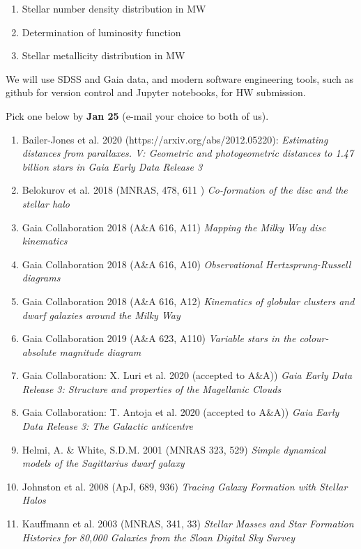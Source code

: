 \documentclass[10pt]{article}
\begin{document}
\begin{enumerate}
\item Stellar number density distribution in MW
\item Determination of luminosity function 
\item Stellar metallicity distribution in MW  
\end{enumerate}

We will use SDSS and Gaia data, and modern software engineering tools, such as github for version control and Jupyter 
notebooks, for HW submission. 

\vskip 0.2in

 Pick one below by {\bf Jan 25} (e-mail your choice to both of us).

\begin{enumerate}
\item Bailer-Jones et al. 2020 (https://arxiv.org/abs/2012.05220):
 {\it Estimating distances from parallaxes. V: Geometric and photogeometric distances to 
1.47 billion stars in Gaia Early Data Release 3} 
\item Belokurov et al. 2018 (MNRAS, 478, 611 ) 
 {\it Co-formation of the disc and the stellar halo}  
\item Gaia Collaboration 2018 (A\&A 616, A11)
{\it Mapping the Milky Way disc kinematics}
\item Gaia Collaboration 2018 (A\&A 616, A10)
{\it Observational Hertzsprung-Russell diagrams}
\item Gaia Collaboration 2018 (A\&A 616, A12)
{\it Kinematics of globular clusters and dwarf galaxies around the Milky Way}
 \item Gaia Collaboration 2019 (A\&A 623, A110)
{\it Variable stars in the colour-absolute magnitude diagram}
\item  Gaia Collaboration: X. Luri et al. 2020 (accepted to A\&A))
{\it Gaia Early Data Release 3: Structure and properties of the Magellanic Clouds}
\item  Gaia Collaboration: T. Antoja et al. 2020 (accepted to A\&A))
{\it Gaia Early Data Release 3: The Galactic anticentre}
\item Helmi, A. \& White, S.D.M. 2001 (MNRAS 323, 529)
         {\it Simple dynamical models of the Sagittarius dwarf galaxy}
\item Johnston et al. 2008 (ApJ, 689, 936)
    {\it Tracing Galaxy Formation with Stellar Halos}
\item  Kauffmann et al. 2003 (MNRAS, 341, 33) 
   {\it Stellar Masses and Star Formation Histories for 80,000 Galaxies from the Sloan Digital Sky Survey} 

\end{enumerate}
\end{document}
